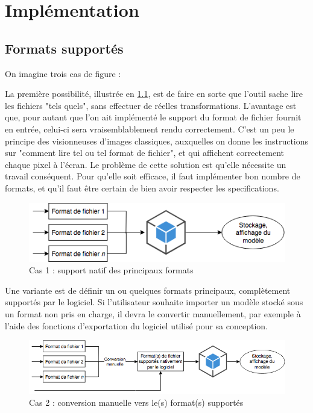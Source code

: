 \chapter{Implémentation}
\label{Chapter3}

\section{Formats supportés}

On imagine trois cas de figure :

La première possibilité, illustrée en \ref{fig:file-importation-process-native}, est de faire en sorte que l'outil sache lire les fichiers "tels quels", sans effectuer de réelles transformations.
L'avantage est que, pour autant que l'on ait implémenté le support du format de fichier fournit en entrée, celui-ci sera vraisemblablement rendu correctement. C'est un peu le principe des visionneuses d'images classiques, auxquelles on donne les instructions sur "comment lire tel ou tel format de fichier", et qui affichent correctement chaque pixel à l'écran.
Le problème de cette solution est qu'elle nécessite un travail conséquent. Pour qu'elle soit efficace, il faut implémenter bon nombre de formats, et qu'il faut être certain de bien avoir respecter les specifications.

\begin{figure}
    \centering
    \includegraphics[width=\linewidth]{Figures/file-importation-process-native.png}
    \caption{Cas 1 : support natif des principaux formats}
    \label{fig:file-importation-process-native}
\end{figure}

Une variante est de définir un ou quelques formats principaux, complètement supportés par le logiciel. Si l'utilisateur souhaite importer un modèle stocké sous un format non pris en charge, il devra le convertir manuellement, par exemple à l'aide des fonctions d'exportation du logiciel utilisé pour sa conception.

\begin{figure}
    \centering
    \includegraphics[width=\linewidth]{Figures/file-importation-process-manual-conversion.png}
    \caption{Cas 2 : conversion manuelle vers le(s) format(s) supportés}
    \label{fig:file-importation-process-manual-conversion}
\end{figure}

